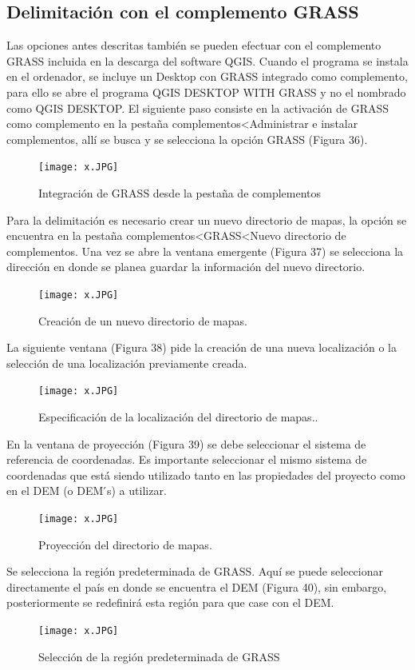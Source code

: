 \documentclass[12pt,hidelinks]{article}
\begin{document}
\subsection{Delimitación con el complemento GRASS}
Las opciones antes descritas también se pueden efectuar con el complemento GRASS incluida en la descarga del software QGIS. Cuando el programa se instala en el ordenador, se incluye un Desktop con GRASS integrado como complemento, para ello se abre el programa QGIS DESKTOP WITH GRASS y no el nombrado como QGIS DESKTOP. El siguiente paso consiste en la activación de GRASS como complemento en la pestaña complementos<Administrar e instalar complementos, allí se busca y se selecciona la opción GRASS (Figura 36).
\begin{figure}[H]
    \centering
    \texttt{[image: x.JPG]}
    \caption{  Integración de GRASS desde la pestaña de complementos}
 \label{fig:my_label}
\end{figure}
Para la delimitación es necesario crear un nuevo directorio de mapas, la opción se encuentra en la pestaña complementos<GRASS<Nuevo directorio de complementos. Una vez se abre la ventana emergente (Figura 37) se selecciona la dirección en donde se planea guardar la información del nuevo directorio.
\begin{figure}[H]
    \centering
    \texttt{[image: x.JPG]}
    \caption{   Creación de un nuevo directorio de mapas.}
 \label{fig:my_label}
\end{figure}
La siguiente ventana (Figura 38) pide la creación de una nueva localización o la selección de una localización previamente creada.
\begin{figure}[H]
    \centering
    \texttt{[image: x.JPG]}
    \caption{   Especificación de la localización del directorio de mapas..}
 \label{fig:my_label}
\end{figure}
En la ventana de proyección (Figura 39) se debe seleccionar el sistema de referencia de coordenadas. Es importante seleccionar el mismo sistema de coordenadas que está siendo utilizado tanto en las propiedades del proyecto como en el DEM (o DEM ́s) a utilizar.
\begin{figure}[H]
    \centering
    \texttt{[image: x.JPG]}
    \caption{   Proyección del directorio de mapas.}
 \label{fig:my_label}
\end{figure}
Se selecciona la región predeterminada de GRASS. Aquí se puede seleccionar directamente el país en donde se encuentra el DEM (Figura 40), sin embargo, posteriormente se redefinirá esta región para que case con el DEM.
\begin{figure}[H]
    \centering
    \texttt{[image: x.JPG]}
    \caption{   Selección de la región predeterminada de GRASS}
 \label{fig:my_label}
\end{figure}
\end{document}
